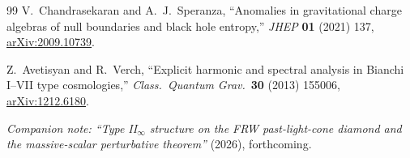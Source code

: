 \documentclass[11pt,a4paper]{article}
\theoremstyle{remark}
\begin{document}
\begin{thebibliography}{99}
V.~Chandrasekaran and A.~J.~Speranza,
``Anomalies in gravitational charge algebras of null boundaries and
black hole entropy,''
\emph{JHEP} \textbf{01} (2021) 137,
\href{http://arxiv.org/abs/2009.10739}{arXiv:2009.10739}.

Z.~Avetisyan and R.~Verch,
``Explicit harmonic and spectral analysis in Bianchi I--VII type
cosmologies,''
\emph{Class.\ Quantum Grav.}\ \textbf{30} (2013) 155006,
\href{http://arxiv.org/abs/1212.6180}{arXiv:1212.6180}.

\emph{Companion note: ``Type II$_\infty$ structure on the FRW
past-light-cone diamond and the massive-scalar perturbative theorem''}
(2026), forthcoming.

\end{thebibliography}
\end{document}
